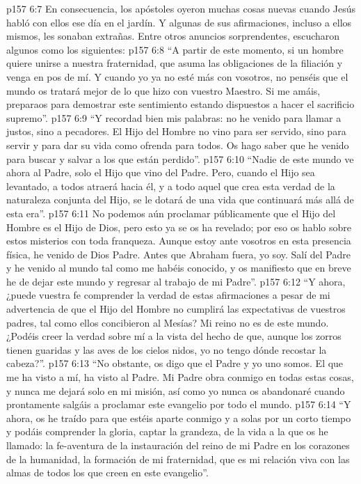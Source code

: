 \vs p157 6:7 En consecuencia, los apóstoles oyeron muchas cosas nuevas cuando Jesús habló con ellos ese día en el jardín. Y algunas de sus afirmaciones, incluso a ellos mismos, les sonaban extrañas. Entre otros anuncios sorprendentes, escucharon algunos como los siguientes:
\vs p157 6:8 \pc “A partir de este momento, si un hombre quiere unirse a nuestra fraternidad, que asuma las obligaciones de la filiación y venga en pos de mí. Y cuando yo ya no esté más con vosotros, no penséis que el mundo os tratará mejor de lo que hizo con vuestro Maestro. Si me amáis, preparaos para demostrar este sentimiento estando dispuestos a hacer el sacrificio supremo”.
\vs p157 6:9 \pc “Y recordad bien mis palabras: no he venido para llamar a justos, sino a pecadores. El Hijo del Hombre no vino para ser servido, sino para servir y para dar su vida como ofrenda para todos. Os hago saber que he venido para buscar y salvar a los que están perdido”.
\vs p157 6:10 \pc “Nadie de este mundo ve ahora al Padre, solo el Hijo que vino del Padre. Pero, cuando el Hijo sea levantado, a todos atraerá hacia él, y a todo aquel que crea esta verdad de la naturaleza conjunta del Hijo, se le dotará de una vida que continuará más allá de esta era”.
\vs p157 6:11 \pc No podemos aún proclamar públicamente que el Hijo del Hombre es el Hijo de Dios, pero esto ya se os ha revelado; por eso os hablo sobre estos misterios con toda franqueza. Aunque estoy ante vosotros en esta presencia física, he venido de Dios Padre. Antes que Abraham fuera, yo soy. Salí del Padre y he venido al mundo tal como me habéis conocido, y os manifiesto que en breve he de dejar este mundo y regresar al trabajo de mi Padre”.
\vs p157 6:12 \pc “Y ahora, ¿puede vuestra fe comprender la verdad de estas afirmaciones a pesar de mi advertencia de que el Hijo del Hombre no cumplirá las expectativas de vuestros padres, tal como ellos concibieron al Mesías? Mi reino no es de este mundo. ¿Podéis creer la verdad sobre mí a la vista del hecho de que, aunque los zorros tienen guaridas y las aves de los cielos nidos, yo no tengo dónde recostar la cabeza?”.
\vs p157 6:13 \pc “No obstante, os digo que el Padre y yo uno somos. El que me ha visto a mí, ha visto al Padre. Mi Padre obra conmigo en todas estas cosas, y nunca me dejará solo en mi misión, así como yo nunca os abandonaré cuando prontamente salgáis a proclamar este evangelio por todo el mundo.
\vs p157 6:14 “Y ahora, os he traído para que estéis aparte conmigo y a solas por un corto tiempo y podáis comprender la gloria, captar la grandeza, de la vida a la que os he llamado: la fe\hyp{}aventura de la instauración del reino de mi Padre en los corazones de la humanidad, la formación de mi fraternidad, que es mi relación viva con las almas de todos los que creen en este evangelio”.
